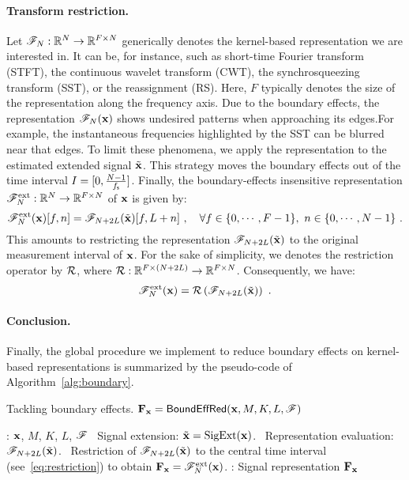 \paragraph{Transform restriction.} 
Let ${\mathscr F}_{N}:{\mathbb R}^{N}\to{\mathbb R}^{F\times N}$ generically denotes the kernel-based representation we are interested in. It can be, for instance, such as short-time Fourier transform (STFT), the continuous wavelet transform (CWT), the synchrosqueezing transform (SST), or the reassignment (RS). Here, $F$ typically denotes the size of the representation along the frequency axis. Due to the boundary effects, the representation ${\mathscr F}_{N}({\mathbf x})$ shows undesired patterns when approaching its edges.For example, the instantaneous frequencies highlighted by the SST can be blurred near that edges. To limit these phenomena, we apply the representation to the estimated extended signal $\tilde{{\mathbf x}}$. This strategy moves the boundary effects out of the time interval $I=[0, \frac{N-1}{f_{\mathsf s}}]$. Finally, the boundary-effects insensitive representation ${\mathscr F}_N^{\mathrm{ext}}:{\mathbb R}^{N}\to{\mathbb R}^{F\times N}$ of ${\mathbf x}$ is given by:
\begin{equation}
\ccF_N^{\mathrm{ext}}(\bx)[f,n] = \ccF_{N+2L}(\tilde \bx)[f,L+n]\ ,\quad\forall f\in\{0,\cdots,F-1\},\ n\in\{0,\cdots,N-1\}\ .
\label{eq:restriction}
\end{equation}
This amounts to restricting the representation ${\mathscr F}_{N+2L}(\tilde {{\mathbf x}})$ to the original measurement interval of ${\mathbf x}$. For the sake of simplicity, we denotes the restriction operator by ${\mathcal R}$, where ${\mathcal R}:{\mathbb R}^{F\times (N+2L)}\to{\mathbb R}^{F\times N}$. Consequently, we have:
\begin{equation*}
{\mathscr F}_N^{\mathrm{ext}}({\mathbf x}) = {\mathcal R}\left( {\mathscr F}_{N+2L}(\tilde {{\mathbf x}}) \right) \ .
\end{equation*}

\paragraph{Conclusion.}
Finally, the global procedure we implement to reduce boundary effects on kernel-based representations is summarized by the pseudo-code of Algorithm~\ref{alg:boundary}.

\begin{algorithm}
\caption{Tackling boundary effects. ${\mathbf F}_{\mathbf x} = \mathsf{BoundEffRed(}{\mathbf x},M,K,L,{\mathscr F})$}
\label{alg:boundary}
\begin{algorithmic}
: ${\mathbf x}$, $M$, $K$, $L$, ${\mathscr F}$
\STATE 
{}
\STATE \quad\textbullet\ Signal extension: $\tilde{{\mathbf x}} = \mathrm{SigExt}({\mathbf x})$.
\STATE 
{}
\STATE \quad\textbullet\ Representation evaluation: ${\mathscr F}_{N+2L}(\tilde{{\mathbf x}})$.
\STATE \quad\textbullet\ Restriction of ${\mathscr F}_{N+2L}(\tilde{{\mathbf x}})$ to the central time interval (see~\eqref{eq:restriction}) to obtain ${\mathbf F}_{\mathbf x}={\mathscr F}_N^{\mathrm{ext}}({\mathbf x})$.
\STATE 
{}: Signal representation ${\mathbf F}_{\mathbf x}$
\end{algorithmic}
\end{algorithm}